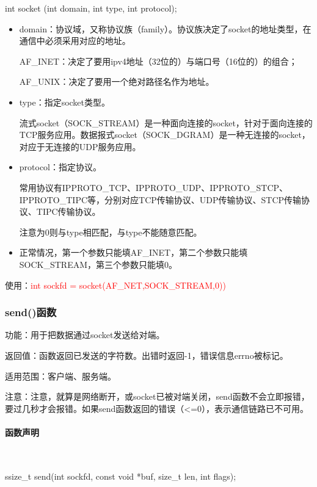 \documentclass[UTF8]{article}%
\begin{document}
int socket (int domain, int type, int protocol);

\begin{itemize}
    \item domain：协议域，又称协议族（family）。协议族决定了socket的地址类型，在通信中必须采用对应的地址。
    
        AF\_INET：决定了要用ipv4地址（32位的）与端口号（16位的）的组合；

        AF\_UNIX：决定了要用一个绝对路径名作为地址。

    \item type：指定socket类型。
    
        流式socket（SOCK\_STREAM）是一种面向连接的socket，针对于面向连接的TCP服务应用。数据报式socket（SOCK\_DGRAM）是一种无连接的socket，对应于无连接的UDP服务应用。

    \item protocol：指定协议。
    
        常用协议有IPPROTO\_TCP、IPPROTO\_UDP、IPPROTO\_STCP、IPPROTO\_TIPC等，分别对应TCP传输协议、UDP传输协议、STCP传输协议、TIPC传输协议。

        注意为0则与type相匹配，与type不能随意匹配。

    \item 正常情况，第一个参数只能填AF\_INET，第二个参数只能填SOCK\_STREAM，第三个参数只能填0。
\end{itemize}

使用：\textcolor{red}{int sockfd = socket(AF\_NET,SOCK\_STREAM,0))}

\subsubsection{send()函数}

功能：用于把数据通过socket发送给对端。

返回值：函数返回已发送的字符数。出错时返回-1，错误信息errno被标记。

适用范围：客户端、服务端。

注意：注意，就算是网络断开，或socket已被对端关闭，send函数不会立即报错，要过几秒才会报错。如果send函数返回的错误（<=0），表示通信链路已不可用。

\paragraph{函数声明}~{}

ssize\_t send(int sockfd, const void *buf, size\_t len, int flags);
\end{document}
